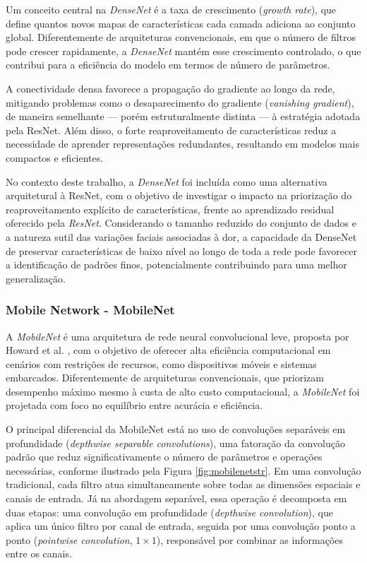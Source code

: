 Um conceito central na \textit{DenseNet} é a taxa de crescimento (\textit{growth rate}), que define quantos novos mapas de características cada camada adiciona ao conjunto global. Diferentemente de arquiteturas convencionais, em que o número de filtros pode crescer rapidamente, a \textit{DenseNet} mantém esse crescimento controlado, o que contribui para a eficiência do modelo em termos de número de parâmetros. 

A conectividade densa favorece a propagação do gradiente ao longo da rede, mitigando problemas como o desaparecimento do gradiente (\textit{vanishing gradient}), de maneira semelhante — porém estruturalmente distinta — à estratégia adotada pela ResNet. Além disso, o forte reaproveitamento de características reduz a necessidade de aprender representações redundantes, resultando em modelos mais compactos e eficientes.

No contexto deste trabalho, a \textit{DenseNet} foi incluída como uma alternativa arquitetural à ResNet, com o objetivo de investigar o impacto na priorização do reaproveitamento explícito de características, frente ao aprendizado residual oferecido pela \textit{ResNet}. Considerando o tamanho reduzido do conjunto de dados e a natureza sutil das variações faciais associadas à dor, a capacidade da DenseNet de preservar características de baixo nível ao longo de toda a rede pode favorecer a identificação de padrões finos, potencialmente contribuindo para uma melhor generalização.

\subsubsection*{Mobile Network - MobileNet}

A \textit{MobileNet} é uma arquitetura de rede neural convolucional leve, proposta por Howard et al. \cite{Howard2017}, com o objetivo de oferecer alta eficiência computacional em cenários com restrições de recursos, como dispositivos móveis e sistemas embarcados. Diferentemente de arquiteturas convencionais, que priorizam desempenho máximo mesmo à custa de alto custo computacional, a \textit{MobileNet} foi projetada com foco no equilíbrio entre acurácia e eficiência.

O principal diferencial da MobileNet está no uso de convoluções separáveis em profundidade (\textit{depthwise separable convolutions}), uma fatoração da convolução padrão que reduz significativamente o número de parâmetros e operações necessárias, conforme ilustrado pela Figura \ref{fig:mobilenetstr}. Em uma convolução tradicional, cada filtro atua simultaneamente sobre todas as dimensões espaciais e canais de entrada. Já na abordagem separável, essa operação é decomposta em duas etapas: uma convolução em profundidade (\textit{depthwise convolution}), que aplica um único filtro por canal de entrada, seguida por uma convolução ponto a ponto (\textit{pointwise convolution}, $1\times1$), responsável por combinar as informações entre os canais.

